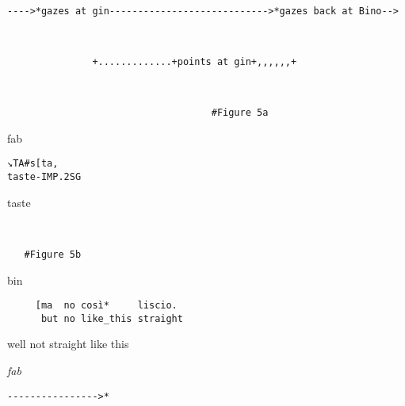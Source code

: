 \documentclass[output=paper,modfonts]{langscibook}
\begin{document}
%
\begin{transbox}{9}{~}
\begin{verbatim}
---->*gazes at gin---------------------------->*gazes back at Bino-->
\end{verbatim}
\end{transbox}
%
\begin{transbox}{10}{~}
\begin{verbatim}
               +.............+points at gin+,,,,,,+
\end{verbatim}
\end{transbox}\vspace{-0.25mm}
%
\begin{transbox}{11}{~}
\begin{verbatim}
                                    #Figure 5a
\end{verbatim}
\end{transbox}\vspace{-1mm}
%
%
\begin{mdframednoverticalspace}[style=firstfoc]
\begin{transbox}{13}{fab}
\begin{verbatim}
↘TA#s[ta,
taste-IMP.2SG
\end{verbatim}
taste
\end{transbox}
\end{mdframednoverticalspace}\vspace{2mm}
%
\begin{transbox}{14}{~}
\begin{verbatim}
   #Figure 5b                                
\end{verbatim}
\end{transbox}\vspace{-0.5mm}
%
\begin{mdframednoverticalspace}[style=secondfoc]
\begin{transbox}{15}{bin}
\begin{verbatim}
     [ma  no così*     liscio.
      but no like_this straight
\end{verbatim}
\hspace{0.8cm} well not straight like this
\end{transbox}
\end{mdframednoverticalspace}
%
\begin{transbox}{16}{\textit{fab}}
\begin{verbatim}
---------------->*
\end{verbatim}
\end{transbox}\bigskip
\end{document}
